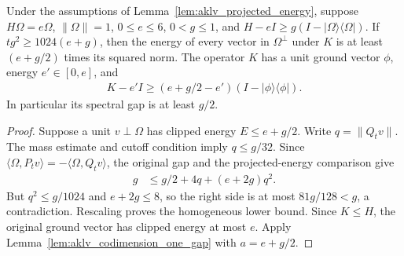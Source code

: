 \begin{lemma}
    \label{lem:aklv_clipped_gap}
    \leanok
    Under the assumptions of Lemma~\ref{lem:aklv_projected_energy}, suppose
    $H\Omega=e\Omega$, $\|\Omega\|=1$, $0\le e\le6$, $0<g\le1$, and
    $H-eI\ge g(I-|\Omega\rangle\langle\Omega|)$.
    If $tg^2\ge1024(e+g)$, then the energy of every vector in
    $\Omega^\perp$ under $K$ is at least $(e+g/2)$ times its squared norm.
    The operator $K$ has a unit ground vector $\phi$, energy
    $e'\in[0,e]$, and
    \begin{align}
        K-e'I\ge(e+g/2-e')(I-|\phi\rangle\langle\phi|).
    \end{align}
    In particular its spectral gap is at least $g/2$.
\end{lemma}
\begin{proof}\leanok
    Suppose a unit $v\perp\Omega$ has clipped energy $E\le e+g/2$.
    Write $q=\|Q_tv\|$. The mass estimate and cutoff condition imply
    $q\le g/32$. Since
    $\langle\Omega,P_tv\rangle=-\langle\Omega,Q_tv\rangle$, the original
    gap and the projected-energy comparison give
    \begin{align}
        g & \le g/2+4q+(e+2g)q^2.
    \end{align}
    But $q^2\le g/1024$ and $e+2g\le8$, so the right side is at most
    $81g/128<g$, a contradiction. Rescaling proves the homogeneous
    lower bound. Since $K\le H$, the original ground vector has clipped
    energy at most $e$. Apply Lemma~\ref{lem:aklv_codimension_one_gap} with
    $a=e+g/2$.
\end{proof}

